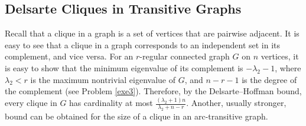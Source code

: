 \documentclass[11pt]{article}
\theoremstyle{definition}
\begin{document}
\subsection{Delsarte Cliques in Transitive Graphs}

Recall that a clique in a graph
is a set of vertices that are pairwise adjacent.
It is easy to see that a clique in a graph corresponds to an independent set in its complement, and vice versa.
 For an $r$-regular connected graph $G$ on $n$ vertices,
it is easy to show that the minimum eigenvalue of its complement
is $-\lambda_2-1$, where $\lambda_2<r$ is the maximum
nontrivial eigenvalue of $G$, and $n-r-1$
is the degree of the complement (see Problem \ref{exe3}). Therefore, by the Delsarte--Hoffman bound,
 every clique in $G$
 has cardinality at most
$\frac{(\lambda_2+1)n}{\lambda_2+n-r}$. Another, usually stronger, bound can be obtained for the size of a clique in an arc-transitive graph.
\end{document}
